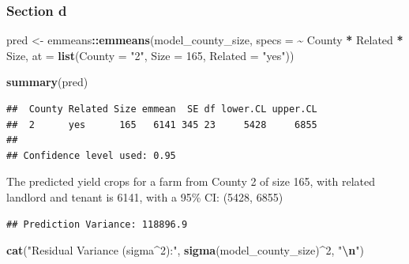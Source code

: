 \documentclass[
  11pt,
]{article}
\newenvironment{Shaded}{\begin{snugshade}}{\end{snugshade}}
\newcommand{\AttributeTok}[1]{\textcolor[rgb]{0.13,0.29,0.53}{#1}}
\newcommand{\CommentTok}[1]{\textcolor[rgb]{0.56,0.35,0.01}{\textit{#1}}}
\newcommand{\DecValTok}[1]{\textcolor[rgb]{0.00,0.00,0.81}{#1}}
\newcommand{\FunctionTok}[1]{\textcolor[rgb]{0.13,0.29,0.53}{\textbf{#1}}}
\newcommand{\NormalTok}[1]{#1}
\newcommand{\OtherTok}[1]{\textcolor[rgb]{0.56,0.35,0.01}{#1}}
\newcommand{\SpecialCharTok}[1]{\textcolor[rgb]{0.81,0.36,0.00}{\textbf{#1}}}
\newcommand{\StringTok}[1]{\textcolor[rgb]{0.31,0.60,0.02}{#1}}
\begin{document}
\subsubsection{Section d}\label{section-d-1}

\begin{Shaded}
\begin{Highlighting}[]
\NormalTok{pred }\OtherTok{\textless{}{-}}\NormalTok{ emmeans}\SpecialCharTok{::}\FunctionTok{emmeans}\NormalTok{(model\_county\_size, }\AttributeTok{specs =} \SpecialCharTok{\textasciitilde{}}\NormalTok{ County }\SpecialCharTok{*}\NormalTok{ Related }\SpecialCharTok{*}\NormalTok{ Size, }
                \AttributeTok{at =} \FunctionTok{list}\NormalTok{(}\AttributeTok{County =} \StringTok{"2"}\NormalTok{, }\AttributeTok{Size =} \DecValTok{165}\NormalTok{, }\AttributeTok{Related =} \StringTok{"yes"}\NormalTok{))}

\FunctionTok{summary}\NormalTok{(pred)}
\end{Highlighting}
\end{Shaded}

\begin{verbatim}
##  County Related Size emmean  SE df lower.CL upper.CL
##  2      yes      165   6141 345 23     5428     6855
## 
## Confidence level used: 0.95
\end{verbatim}

The predicted yield crops for a farm from County 2 of size 165, with
related landlord and tenant is 6141, with a 95\% CI: (5428, 6855)

\begin{Shaded}
\end{Shaded}

\begin{verbatim}
## Prediction Variance: 118896.9
\end{verbatim}

\begin{Shaded}
\begin{Highlighting}[]
\FunctionTok{cat}\NormalTok{(}\StringTok{"Residual Variance (sigma\^{}2):"}\NormalTok{, }\FunctionTok{sigma}\NormalTok{(model\_county\_size)}\SpecialCharTok{\^{}}\DecValTok{2}\NormalTok{, }\StringTok{"}\SpecialCharTok{\textbackslash{}n}\StringTok{"}\NormalTok{)}
\end{Highlighting}
\end{Shaded}
\end{document}
